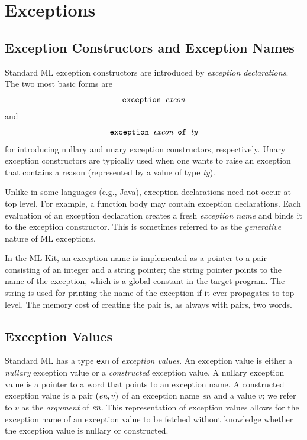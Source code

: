 \documentclass[12pt]{book}
\begin{document}
\chapter{Exceptions}
\label{exceptions.sec}
\section{Exception Constructors and Exception Names}
Standard ML
%
exception constructors are introduced by
% 
{\em exception declarations}. The two most basic forms are
$$\hbox{\tt exception {\it excon}}$$
and 
$$\hbox{\tt exception {\it excon} of {\it ty}}$$
for introducing nullary and unary exception constructors,
respectively. Unary exception constructors are typically
used when one wants to raise an exception that contains a
reason (represented by a value of type {\it ty}).

Unlike in some languages (e.g., Java), exception declarations need not
occur at top level. For example, a function body may contain exception
declarations.  Each evaluation of an exception declaration creates a
fresh
%
{\em exception name\/} and binds it to the exception constructor. This
is sometimes referred to as the {\em generative\/} nature of ML
exceptions.

In the ML Kit, an exception name is implemented as a pointer to a pair
consisting of an integer and a string pointer; the string pointer
points to the name of the exception, which is a global constant in the
target program. The string is used for printing the name of the
exception if it ever propagates to top level. The memory cost of creating
the pair is, as always with pairs, two words.

\section{Exception Values}
Standard ML has a type 
%
{\tt exn} of 
%
{\em exception values}.  An exception value is either a
%
{\em nullary\/} exception value or a 
%
{\em constructed\/} exception value. A nullary exception value is a
pointer to a word that points to an exception name. A constructed
exception value is a pair $(\hbox{\it en},v)$ of an exception name $\hbox{\it en}$
and a value $v$; we refer to $v$ as the {\em argument\/} of $\hbox{\it en}$.
This representation of exception values allows for the exception name
of an exception value to be fetched without knowledge whether the
exception value is nullary or constructed.
\end{document}
